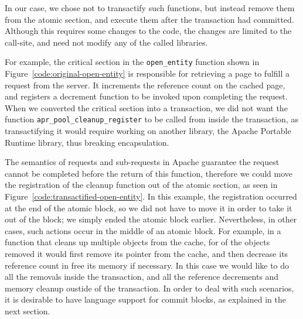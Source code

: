 \documentclass[preprint,11pt]{sigplanconf}
\begin{document}
In our case, we chose not to transactify such functions, but instead remove them
from the atomic section, and execute them after the transaction had committed.
Although this requires some changes to the code, the changes are limited to the
call-site, and need not modify any of the called libraries.

For example, the  critical section in the {\tt open\_entity} function
shown in Figure~\ref{code:original-open-entity}
 is responsible for retrieving a page
to fulfill a request from the server. It  increments the reference count on
the cached page, and registers a decrement function to be invoked upon completing
the request. When we converted the critical section into a transaction, we
did not want the function {\tt apr\_pool\_cleanup\_register} to be called from
inside the transaction, as transactifying it would require working on another
library, the Apache Portable Runtime library, thus breaking encapsulation.

The semantics of requests and sub-requests in Apache guarantee the request
cannot be completed before the return of this function, therefore we could
move the registration of the cleanup function out of the atomic section, as 
seen in Figure~\ref{code:transactified-open-entity}. In this example, 
the registration occurred at the end of the atomic block, so 
we did not have to move it in order to take it out of the block;
we simply ended the atomic block earlier. Nevertheless, in other cases,
such actions occur in the middle of an atomic block. For example, in a function
that cleans up multiple objects from the cache, for of the objects removed it
would first remove its pointer from the cache, and then decrease its reference
count in free its memory if necessary. In this case we would like to do all the
removals inside the transaction, and all the reference decrements and memory
cleanup oustide of the transaction. In order to deal with such scenarios, it is
desirable to have language support for commit blocks, as explained in the next
section. 
\end{document}
